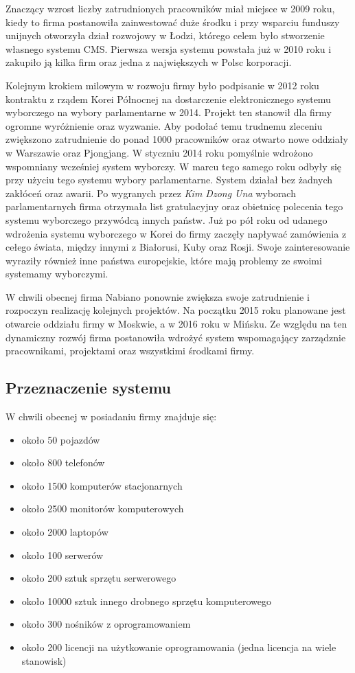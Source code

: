 Znaczący wzrost liczby zatrudnionych pracowników miał miejsce w 2009
roku, kiedy to firma postanowiła zainwestować duże środku i przy
wsparciu funduszy unijnych otworzyła dział rozwojowy w Łodzi, którego celem
było stworzenie własnego systemu CMS. Pierwsza wersja systemu powstała
już w 2010 roku i zakupiło ją kilka firm oraz jedna z największych w
Polsc korporacji.

Kolejnym krokiem milowym w rozwoju firmy było podpisanie w 2012 roku
kontraktu z rządem Korei Północnej na dostarczenie elektronicznego
systemu wyborczego na wybory parlamentarne w 2014. Projekt ten
stanowił dla firmy ogromne wyróżnienie oraz wyzwanie. Aby podołać temu
trudnemu zleceniu zwiększono zatrudnienie do ponad 1000 pracowników
oraz otwarto nowe oddziały w Warszawie oraz Pjongjang. W styczniu 2014
roku pomyślnie wdrożono wspomniany wcześniej system wyborczy. W marcu
tego samego roku odbyły się przy użyciu tego systemu wybory
parlamentarne. System działał bez żadnych zakłóceń oraz awarii. Po
wygranych przez {\it Kim Dzong Una} wyborach parlamentarnych firma
otrzymała list gratulacyjny oraz obietnicę polecenia tego systemu
wyborczego przywódcą innych państw. Już po pół roku od udanego
wdrożenia systemu wyborczego w Korei do firmy zaczęły napływać
zamówienia z cełego świata, między innymi z Białorusi, Kuby oraz
Rosji. Swoje zainteresowanie wyraziły również inne państwa
europejskie, które mają problemy ze swoimi systemamy wyborczymi.

W chwili obecnej firma Nabiano ponownie zwiększa swoje zatrudnienie i
rozpoczyn realizację kolejnych projektów. Na początku 2015 roku
planowane jest otwarcie oddziału firmy w Moskwie, a w 2016 roku w
Mińsku. Ze względu na ten dynamiczny rozwój firma postanowiła wdrożyć
system wspomagający zarządznie pracownikami, projektami oraz
wszystkimi środkami firmy.

\subsection{Przeznaczenie systemu}

W chwili obecnej w posiadaniu firmy znajduje się:

\begin{itemize}
\item około 50 pojazdów
\item około 800 telefonów
\item około 1500 komputerów stacjonarnych
\item około 2500 monitorów komputerowych
\item około 2000 laptopów
\item około 100 serwerów
\item około 200 sztuk sprzętu serwerowego
\item około 10000 sztuk innego drobnego sprzętu komputerowego
\item około 300 nośników z oprogramowaniem
\item około 200 licencji na użytkowanie oprogramowania (jedna licencja na wiele stanowisk)
\end{itemize}

